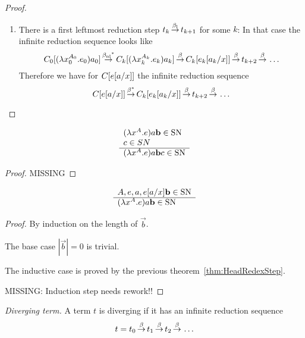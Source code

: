 {\begin{theorem}
\begin{proof}
\begin{enumerate}
            \item There is a first leftmost reduction step $t_k {\,\stackrel{{\beta_{\text{l}}}}{\to}\,}
                t_{k+1}$ for some $k$: In that case the infinite reduction
                sequence looks like
                $$
                    C_0[{{(\lambda x_{0}^{A_{0}}. e_{0}) a_{0}}}]
                    {{\,\stackrel{{{\beta_{\text{nl}}}}^*}{\to}\,}} C_k[{{(\lambda x_{k}^{A_{k}}. e_{k}) a_{k}}}]
                    {\,\stackrel{\beta}{\to}\,} C_k[e_k[a_k/x]]
                    {\,\stackrel{\beta}{\to}\,} t_{k+2}
                    {\,\stackrel{\beta}{\to}\,} \ldots
                $$
                Therefore we have for $C[{e[a/x]}]$ the infinite reduction
                sequence
                $$
                C[{e[a/x]}]
                {\,\stackrel{\beta^*}{\to}\,} C_k[e_k[a_k/x]]
                {\,\stackrel{\beta}{\to}\,} t_{k+2}
                {\,\stackrel{\beta}{\to}\,} \ldots
                $$
            \end{enumerate}
        \end{proof}
    \end{theorem}
}


\begin{theorem}
    \label{thm:HeadRedexStep}
    $$
    \begin{array}{l} 
        (\lambda x^A. e) a {\mathbf b} \in {\text{SN}}
        \\
        c \in SN
     \\ \hline 
        (\lambda x^A. e) a {\mathbf b} c \in {\text{SN}}
    \end{array}
    $$
    \begin{proof}
        MISSING
    \end{proof}
\end{theorem}





\begin{theorem}
    \label{thm:StronglyNormalizingRedex}
    $$
    \begin{array}{l} 
        A, e, a, e[a/x] {\mathbf b}  \in {\text{SN}}
     \\ \hline 
        (\lambda x^A. e) a {\mathbf b} \in {\text{SN}}
    \end{array}
    $$
    \begin{proof} By induction on the length of $\vec b$.

        The base case $|\vec b| = 0$ is trivial.

        The inductive case is proved by the previous
        theorem~\ref{thm:HeadRedexStep}.

        MISSING: Induction step needs rework!!
    \end{proof}
\end{theorem}








\begin{definition}
    \emph{Diverging term.} A term $t$ is diverging if it has an infinite
    reduction sequence
    $$
    t = t_0 {\,\stackrel{\beta}{\to}\,} t_1 {\,\stackrel{\beta}{\to}\,} t_2 {\,\stackrel{\beta}{\to}\,} \ldots
    $$
\end{definition}





